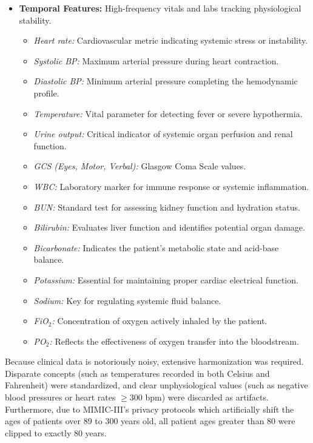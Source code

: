 \begin{itemize}
    \item \textbf{Temporal Features:} High-frequency vitals and labs tracking physiological stability.
          \begin{itemize}
              \item \textit{Heart rate:} Cardiovascular metric indicating systemic stress or instability.
              \item \textit{Systolic BP:} Maximum arterial pressure during heart contraction.
              \item \textit{Diastolic BP:} Minimum arterial pressure completing the hemodynamic profile.
              \item \textit{Temperature:} Vital parameter for detecting fever or severe hypothermia.
              \item \textit{Urine output:} Critical indicator of systemic organ perfusion and renal function.
              \item \textit{GCS (Eyes, Motor, Verbal):} Glasgow Coma Scale values.
              \item \textit{WBC:} Laboratory marker for immune response or systemic inflammation.
              \item \textit{BUN:} Standard test for assessing kidney function and hydration status.
              \item \textit{Bilirubin:} Evaluates liver function and identifies potential organ damage.
              \item \textit{Bicarbonate:} Indicates the patient's metabolic state and acid-base balance.
              \item \textit{Potassium:} Essential for maintaining proper cardiac electrical function.
              \item \textit{Sodium:} Key for regulating systemic fluid balance.
              \item \textit{FiO$_2$:} Concentration of oxygen actively inhaled by the patient.
              \item \textit{PO$_2$:} Reflects the effectiveness of oxygen transfer into the bloodstream.
          \end{itemize}
\end{itemize}

Because clinical data is notoriously noisy, extensive harmonization was required. Disparate concepts (such as temperatures recorded in both Celsius and Fahrenheit) were standardized, and clear unphysiological values (such as negative blood pressures or heart rates $\ge300$ bpm) were discarded as artifacts. Furthermore, due to MIMIC-III's privacy protocols which artificially shift the ages of patients over 89 to 300 years old, all patient ages greater than 80 were clipped to exactly 80 years.

